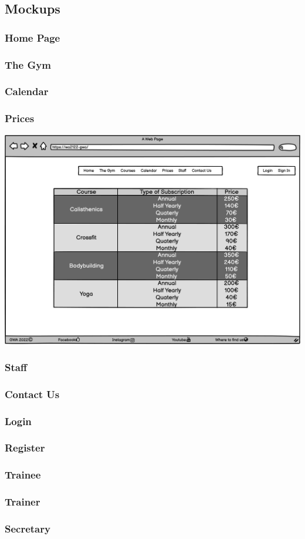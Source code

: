 \newpage
\subsection{Mockups}
\subsubsection{Home Page}
\subsubsection{The Gym}
\subsubsection{Calendar}
\subsubsection{Prices}
\includegraphics[width=\columnwidth]{InterfaceMockup/Prices/prices_page.png}
\subsubsection{Staff}
\subsubsection{Contact Us}
\subsubsection{Login}
\subsubsection{Register}
\subsubsection{Trainee}
\subsubsection{Trainer}
\subsubsection{Secretary}
